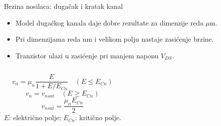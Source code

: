 \begin{frame}[label=09_1-s005]{Brzina nosilaca: dugačak i kratak kanal}\setlength{\parskip}{2pt}\setlength{\abovedisplayskip}{4pt}\setlength{\belowdisplayskip}{4pt}\setlength{\abovedisplayshortskip}{3pt}\setlength{\belowdisplayshortskip}{3pt}
\begin{itemize}
\item Model dugačkog kanala daje dobre rezultate za dimenzije reda $\mu\mathrm m$.
\item Pri dimenzijama reda $\mathrm{nm}$ i velikom polju nastaje zasićenje brzine.
\item Tranzistor ulazi u zasićenje pri manjem naponu $V_{DS}$.
\end{itemize}
\begin{columns}[T,onlytextwidth]\centering \hspace{5mm}\[v_n=\mu_n\frac E{1+E/E_{Cn}}\quad(E\leq E_{Cn})\]
\[v_n=v_{nsat}\quad(E\geq E_{Cn})\]
\[v_{nsat}=\frac{\mu_nE_{Cn}}2\]
$E$: električno polje; $E_{Cn}$: kritično polje.\end{columns}
\end{frame}
